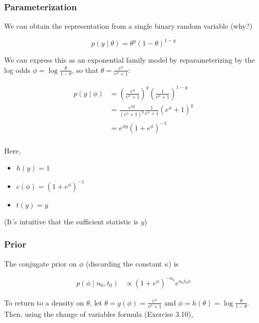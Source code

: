 \documentclass[
]{article}
\providecommand{\tightlist}{%
  \setlength{\itemsep}{0pt}\setlength{\parskip}{0pt}}
\begin{document}
\hypertarget{parameterization}{%
\subsubsection{Parameterization}\label{parameterization}}

We can obtain the representation from a single binary random variable
(why?)

\[p(y \mid \theta) = \theta^{y} (1 - \theta)^{1 - y}\]

We can express this as an exponential family model by reparameterizing
by the log odds \(\phi = \log \frac{\theta}{1 - \theta}\), so that
\(\theta = \frac{e^\phi}{e^\phi + 1}\):

\begin{align}
p(y \mid \phi) &= \left( \frac{e^\phi}{e^\phi + 1} \right)^y \left(\frac{1}{e^\phi + 1} \right)^{1 - y} \\
&= \frac{e^{\phi y}}{(e^\phi + 1)^y} \frac{1}{e^\phi + 1} \left( e^\phi + 1\right)^y \\
&= e^{\phi y} (1 + e^\phi)^{-1} \\
\end{align}

Here,

\begin{itemize}
\tightlist
\item
  \(h(y) = 1\)
\item
  \(c(\phi) = (1 + e^\phi)^{-1}\)
\item
  \(t(y) = y\)
\end{itemize}

(It's intuitive that the sufficient statistic is \(y\))

\hypertarget{prior}{%
\subsubsection{Prior}\label{prior}}

The conjugate prior on \(\phi\) (discarding the constant \(\kappa\)) is

\begin{align}
p(\phi \mid n_0, t_0) &\propto (1 + e^{\phi})^{-n_0} e^{n_0 t_0 \phi}
\end{align}

To return to a density on \(\theta\), let
\(\theta = g(\phi) = \frac{e^\phi}{e^\phi + 1}\) and
\(\phi = h(\theta) = \log \frac{\theta}{1 - \theta}\). Then, using the
change of variables formula (Exercise 3.10),
\end{document}
